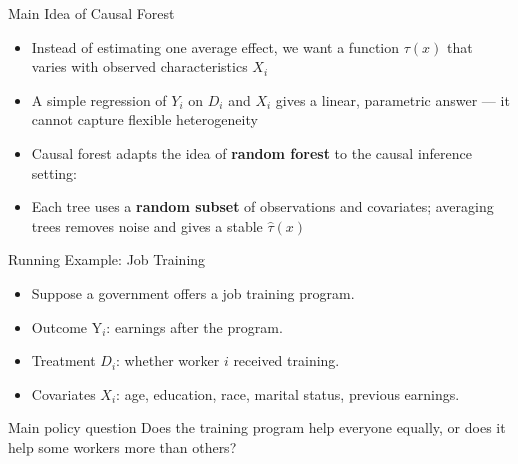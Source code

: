 \documentclass[hyperref={pdfpagelabels=false}]{beamer}
\begin{document}
\begin{frame}{Main Idea of Causal Forest}{}
\begin{itemize}
  \item Instead of estimating one average effect, we want a function $\tau(x)$ that varies with observed characteristics $X_i$
  \vspace{0.2cm}
  \item A simple regression of $Y_i$ on $D_i$ and $X_i$ gives a linear, parametric answer --- it cannot capture flexible heterogeneity
  \vspace{0.2cm}
  \item Causal forest adapts the idea of \textbf{random forest} to the causal inference setting:
\end{itemize}
\vspace{0.15cm}
\begin{center}
\end{center}
\vspace{0.1cm}
\begin{itemize}
  \item Each tree uses a \textbf{random subset} of observations and covariates; averaging trees removes noise and gives a stable $\hat{\tau}(x)$
\end{itemize}
\end{frame}

\begin{frame}{Running Example: Job Training}
\begin{itemize}
  \item Suppose a government offers a job training program.
  \vspace{0.2cm}
  \item Outcome $\mathrm{Y}_i$: earnings after the program.
  \vspace{0.2cm}
  \item Treatment $D_i$: whether worker $i$ received training.
  \vspace{0.2cm}
  \item Covariates $X_i$: age, education, race, marital status, previous earnings.
\end{itemize}

\vspace{0.35cm}
\begin{block}{Main policy question}
  Does the training program help everyone equally, or does it help some workers more than others?
\end{block}
\end{frame}
\end{document}
